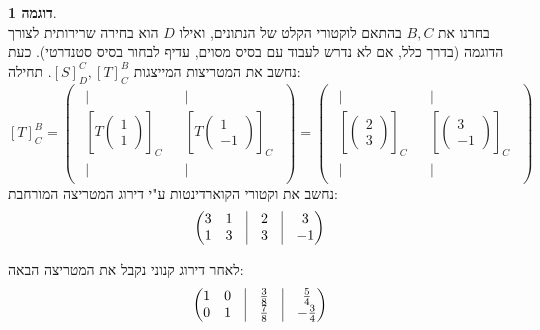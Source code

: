 \documentclass[12pt]{report}
\theoremstyle{plain}
\theoremstyle{definition}
\newtheorem{example}{דוגמה}[chapter]
\newcommand{\0}{\mathbf{0}}
\begin{document}
\begin{example}
$$$$
בחרנו את
$B,C$
בהתאם לוקטורי הקלט של הנתונים, ואילו 
$D$
הוא בחירה שרירותית לצורך הדוגמה (בדרך כלל, אם לא נדרש לעבוד עם בסיס מסוים, עדיף לבחור בסיס סטנדרטי). כעת נחשב את המטריצות המייצגות
$[S]_D^C,[T]_C^B$.
תחילה:
$$
[T]_C^B=\begin{pmatrix}
\begin{array}{c}
|\\[-0.4ex]
\left[T\begin{pmatrix}1\\1\end{pmatrix}\right]_C\\[-0.4ex]
|
\end{array}
&
\begin{array}{c}
|\\[-0.4ex]
\left[T\begin{pmatrix}1\\-1\end{pmatrix}\right]_C\\[-0.4ex]
|
\end{array}
\end{pmatrix}=\begin{pmatrix}
\begin{array}{c}
|\\[-0.4ex]
\left[\begin{pmatrix}2\\3\end{pmatrix}\right]_C\\[-0.4ex]
|
\end{array}
&
\begin{array}{c}
|\\[-0.4ex]
\left[\begin{pmatrix}3\\-1\end{pmatrix}\right]_C\\[-0.4ex]
|
\end{array}
\end{pmatrix}
$$
נחשב את וקטורי הקוארדינטות ע"י דירוג המטריצה המורחבת:
$$
\begin{pmatrix}
3 & 1 & \vline & 2 & \vline & 3 \\
1 & 3 & \vline & 3 & \vline & -1
\end{pmatrix}
$$

לאחר דירוג קנוני נקבל את המטריצה הבאה:
$$
\begin{pmatrix}
1 & 0 & \vline & \frac{3}{8} & \vline & \frac{5}{4} \\
0 & 1 & \vline & \frac{7}{8} & \vline & -\frac{3}{4}
\end{pmatrix}
$$


\end{example}
\end{document}
